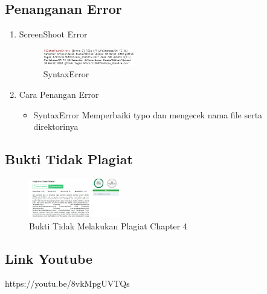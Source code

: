 \subsection{Penanganan Error}
\begin{enumerate}
	\item ScreenShoot Error
	\begin{figure}[H]
		\includegraphics[width=4cm]{figures/1174079/4/error.PNG}
		\centering
		\caption{SyntaxError}
	\end{figure}
	\item Cara Penangan Error
	\begin{itemize}
		\item SyntaxError
		\hfill\break
		Memperbaiki typo dan mengecek nama file serta direktorinya
	\end{itemize}
\end{enumerate}

\subsection{Bukti Tidak Plagiat}
\begin{figure}[H]
\centering
	\includegraphics[width=4cm]{figures/1174079/4/plagiarisme.PNG}
	\caption{Bukti Tidak Melakukan Plagiat Chapter 4}
\end{figure}

\subsection{Link Youtube}
https://youtu.be/8vkMpgUVTQs

